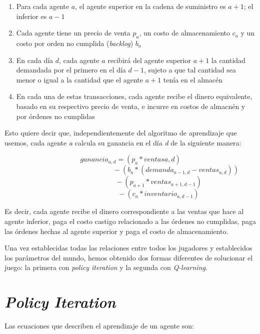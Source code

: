 \begin{enumerate}
    \item Para cada agente \textit{$a$}, el agente superior en la cadena de suministro es \textit{$a+1$}; el inferior es \textit{$a-1$}
    \item Cada agente tiene un precio de venta \textit{$p_{a}$}, un costo de almacenamiento \textit{$c_{a}$} y un costo por orden no cumplida (\textit{backlog}) \textit{$b_{a}$}
    \item En cada d\'ia \textit{$d$}, cada agente \textit{$a$} recibir\'a del agente superior \textit{$a+1$} la cantidad demandada por el primero en el d\'ia \textit{$d-1$}, sujeto a que tal cantidad sea menor o igual a la cantidad que el agente \textit{$a+1$} ten\'ia en el almac\'en
    \item En cada una de estas transacciones, cada agente recibe el dinero equivalente, basado en su respectivo precio de venta, e incurre en costos de almacn\'en y por \'ordenes no cumplidas
\end{enumerate}


Esto quiere decir que, independientemente del algoritmo de aprendizaje que usemos, cada agente \textit{a} calcula su ganancia en el d\'ia \textit{d} de la siguiente manera:

$$
ganancia_{a,d} = (p_{a} * ventas{a, d}) 
$$
$$
\quad  \quad  \quad  \quad  \quad  \quad  \quad  \quad  \quad \quad  \quad   \quad  \quad - (b_{a}* (demanda_{a-1,d} - ventas_{a,d})) 
$$
$$
\quad  \quad  \quad  \quad  \quad  \quad  \quad  \quad - (p_{a+1}*ventas_{a+1, d-1})
$$
$$
\quad  \quad  \quad  \quad  \quad  \quad  \quad  \quad - (c_{a}*inventario_{a,d-1})
$$

Es decir, cada agente recibe el dinero correspondiente a las ventas que hace al agente inferior, paga el costo castigo relacionado a las \'ordenes no cumplidas, paga las \'ordenes hechas al agente superior y paga el costo de almacenamiento.

Una vez establecidas todas las relaciones entre todos los jugadores y establecidos los par\'ametros del mundo, hemos obtenido dos formas diferentes de solucionar el juego: la primera con \textit{policy iteration} y la segunda con \textit{Q-learning}.

\section{\textit{Policy Iteration}}

Las ecuaciones que describen el aprendizaje de un agente son:

